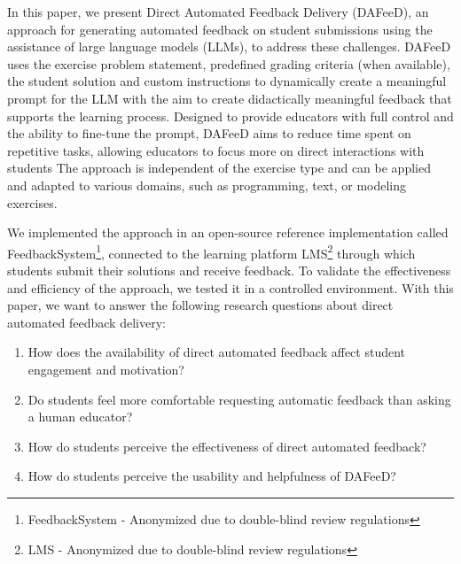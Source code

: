 \documentclass[manuscript,screen,review, anonymous]{acmart}
\begin{document}
In this paper, we present Direct Automated Feedback Delivery (DAFeeD), an approach for generating automated feedback on student submissions using the assistance of large language models (LLMs), to address these challenges.
DAFeeD uses the exercise problem statement, predefined grading criteria (when available), the student solution and custom instructions to dynamically create a meaningful prompt for the LLM with the aim to create didactically meaningful feedback that supports the learning process.
Designed to provide educators with full control and the ability to fine-tune the prompt, DAFeeD aims to reduce time spent on repetitive tasks, allowing educators to focus more on direct interactions with students 
The approach is independent of the exercise type and can be applied and adapted to various domains, such as programming, text, or modeling exercises.

We implemented the approach in an open-source reference implementation called FeedbackSystem\footnote{FeedbackSystem - Anonymized due to double-blind review regulations}, connected to the learning platform LMS\footnote{LMS - Anonymized due to double-blind review regulations} \cite{krusche:2018:ArTEMiSAutomaticAssessmentf} through which students submit their solutions and receive feedback.
To validate the effectiveness and efficiency of the approach, we tested it in a controlled environment. 
With this paper, we want to answer the following research questions about direct automated feedback delivery:

\begin{enumerate}[label=\textbf{RQ\arabic*},ref=RQ\arabic*]
  \item \label{RQ1} How does the availability of direct automated feedback affect student engagement and motivation? 
  \item \label{RQ2} Do students feel more comfortable requesting automatic feedback than asking a human educator?
  \item \label{RQ3} How do students perceive the effectiveness of direct automated feedback?
  \item \label{RQ4} How do students perceive the usability and helpfulness of DAFeeD?
\end{enumerate}
\end{document}
